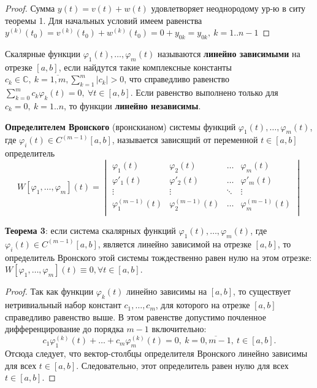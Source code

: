 \begin{proof}
Сумма $y(t) = v(t) + w(t)$ удовлетворяет неоднородому ур-ю в ситу теоремы 1. Для начальных условий имеем равенства $y^{(k)}(t_0) = v^{(k)}(t_0) + w^{(k)}(t_0) = 0 + y_{0k} = y_{0k}, \ k=1..n-1$
\end{proof}

Скалярные функции $\varphi_1(t),\dots ,\varphi_m(t)$ называются \textbf{линейно зависимыми} на отрезке $[a,b]$, если найдутся такие комплексные константы 
$c_k \in \mathbb{C},~k = \overline{1,m}, \sum_{k=1}^m |c_k| > 0$, 
что справедливо равенство
$\displaystyle \sum_{k=0}^m c_k\varphi_k(t) = 0,~\forall t \in [a, b].$
Если равенство выполнено только для $c_k = 0, \ k=1..n$, то функции \textbf{линейно независимы}.

\textbf{Определителем Вронского} (вронскианом) системы функций $\varphi_1(t),\dots, \varphi_m(t)$, 
где $\varphi_i(t) \in C^{(m-1)}[a, b]$, называется зависящий от переменной $t \in [a, b]$ определитель
$$W[\varphi_1,\dots,\varphi_m](t) = \begin{vmatrix} \varphi_1(t) & \varphi_2(t) & \dots & \varphi_m(t) \\ \varphi'_1(t) & \varphi'_2(t) & \dots & \varphi'_m(t) \\ \vdots & \vdots & \ddots & \vdots \\ \varphi^{(m-1)}_1(t) & \varphi^{(m-1)}_2(t) & \dots & \varphi^{(m-1)}_m(t) \\ \end{vmatrix}$$


\textbf{Теорема 3}: если система скалярных функций $\varphi_1(t),\dots, \varphi_m(t)$, 
где $\varphi_i(t) \in C^{(m-1)}[a, b]$,
является линейно зависимой на отрезке $[a, b]$, то определитель Вронского этой системы тождественно равен нулю на этом отрезке: $W[\varphi_1,\dots ,\varphi_m](t) \equiv 0, \forall t \in [a,b]$.

\begin{proof}
Так как функции $\varphi_k(t)$ линейно зависимы на $[a,b]$, то существует нетривиальный набор констант $c_1,\dots, c_m$, для которого на отрезке $[a,b]$ справедливо равенство выше. В этом равенстве допустимо почленное дифференцирование до порядка $m - 1$ включительно:
$$c_1\varphi^{(k)}_1(t)+\dots +c_m\varphi^{(k)}_m(t)=0,~k=\overline{0,m-1},~t\in[a,b].$$
Отсюда следует, что вектор-столбцы определителя Вронского линейно зависимы для всех $t \in [a,b]$. Следовательно, этот определитель равен нулю для всех $t \in [a, b]$.
\end{proof}

